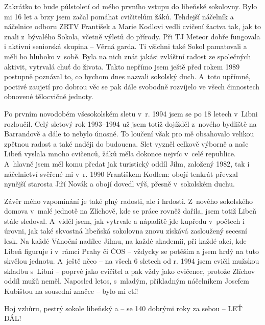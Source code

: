 \documentclass[11pt]{article}
\begin{document}
Zakrátko to bude půlstoletí od mého prvního vstupu do libeňské sokolovny. Bylo mi 16 let a brzy jsem začal pomáhat cvičitelům žáků. Tehdejší náčelník a náčelnice odboru ZRTV František a Marie Kodlovi vedli cvičení žactva tak, jak to znali z~bývalého Sokola, včetně výletů do přírody. Při TJ Meteor dobře fungovala i aktivní seniorská skupina – Věrná garda. Ti všichni také Sokol pamatovali a měli ho hluboko v~sobě. Byla na nich znát jakási zvláštní radost ze společných aktivit, vytrvalá chuť do života. Takto nepřímo jsem ještě před rokem 1989 postupně poznával to, co bychom dnes nazvali sokolský duch. A~toto upřímné, poctivé zaujetí pro dobrou věc se pak dále svobodně rozvíjelo ve všech činnostech obnovené tělocvičné jednoty.

Po prvním novodobém všesokolském sletu v~r. 1994 jsem se po 18 letech v~Libni rozloučil. Celý sletový rok 1993–1994 už jsem totiž dojížděl z~nového bydliště na Barrandově a dále to nebylo únosné. To loučení však pro mě obsahovalo velikou zpětnou radost a také naději do budoucna. Slet vyzněl celkově výborně a naše Libeň vyslala mnoho cvičenců, žáků měla dokonce nejvíc v~celé republice. A~hlavně jsem měl komu předat jak turistický oddíl Jilm, založený 1982, tak i náčelnictví svěřené mi v~r. 1990 Františkem Kodlem: obojí tenkrát převzal nynější starosta Jiří Novák a obojí dovedl výš, přesně v~sokolském duchu.

Závěr mého vzpomínání je také plný radosti, ale i hrdosti. Z~nového sokolského domova v~malé jednotě na Zlíchově, kde se práce rovněž dařila, jsem totiž Libeň stále sledoval. A~viděl jsem, jak vytrvale a nápaditě jde kupředu v~počtech i úrovni, jak také skvostná libeňská sokolovna znovu získává zasloužený secesní lesk. Na každé Vánoční nadílce Jilmu, na každé akademii, při každé akci, kde Libeň figuruje i v~rámci Prahy či ČOS – vždycky se potěším a jsem hrdý na tuto skvělou jednotu. A~ještě něco – na všech 6 sletech od r. 1994 jsem cvičil mužskou skladbu s~Libní – poprvé jako cvičitel a pak vždy jako cvičenec, protože Zlíchov oddíl mužů neměl. Naposled letos, s~mladým, příkladným náčelníkem Josefem Kubištou na sousední značce – bylo mi ctí!

\vspace*{\baselineskip}
\noindent
Hoj vzhůru, pestrý sokole libeňský a – se 140 dobrými roky za sebou – LEŤ DÁL! 


\clearpage


\pagecolor{sokolred}
\color{white}
\renewcommand{\arraystretch}{1.2}
\end{document}
